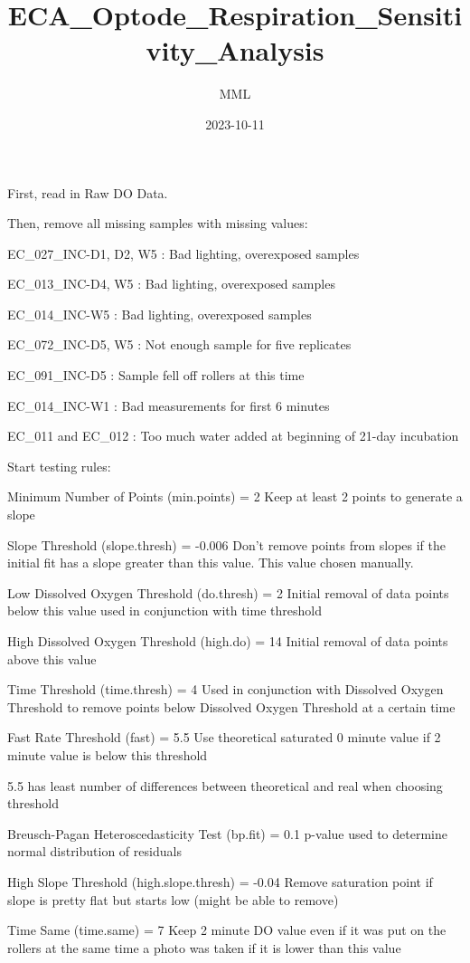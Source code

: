 \documentclass[
]{article}
\title{ECA\_Optode\_Respiration\_Sensitivity\_Analysis}
\author{MML}
\date{2023-10-11}
\begin{document}
\maketitle

First, read in Raw DO Data.

Then, remove all missing samples with missing values:

EC\_027\_INC-D1, D2, W5 : Bad lighting, overexposed samples

EC\_013\_INC-D4, W5 : Bad lighting, overexposed samples

EC\_014\_INC-W5 : Bad lighting, overexposed samples

EC\_072\_INC-D5, W5 : Not enough sample for five replicates

EC\_091\_INC-D5 : Sample fell off rollers at this time

EC\_014\_INC-W1 : Bad measurements for first 6 minutes

EC\_011 and EC\_012 : Too much water added at beginning of 21-day
incubation

Start testing rules:

Minimum Number of Points (min.points) = 2 Keep at least 2 points to
generate a slope

Slope Threshold (slope.thresh) = -0.006 Don't remove points from slopes
if the initial fit has a slope greater than this value. This value
chosen manually.

Low Dissolved Oxygen Threshold (do.thresh) = 2 Initial removal of data
points below this value used in conjunction with time threshold

High Dissolved Oxygen Threshold (high.do) = 14 Initial removal of data
points above this value

Time Threshold (time.thresh) = 4 Used in conjunction with Dissolved
Oxygen Threshold to remove points below Dissolved Oxygen Threshold at a
certain time

Fast Rate Threshold (fast) = 5.5 Use theoretical saturated 0 minute
value if 2 minute value is below this threshold

5.5 has least number of differences between theoretical and real when
choosing threshold

Breusch-Pagan Heteroscedasticity Test (bp.fit) = 0.1 p-value used to
determine normal distribution of residuals

High Slope Threshold (high.slope.thresh) = -0.04 Remove saturation point
if slope is pretty flat but starts low (might be able to remove)

Time Same (time.same) = 7 Keep 2 minute DO value even if it was put on
the rollers at the same time a photo was taken if it is lower than this
value
\end{document}
